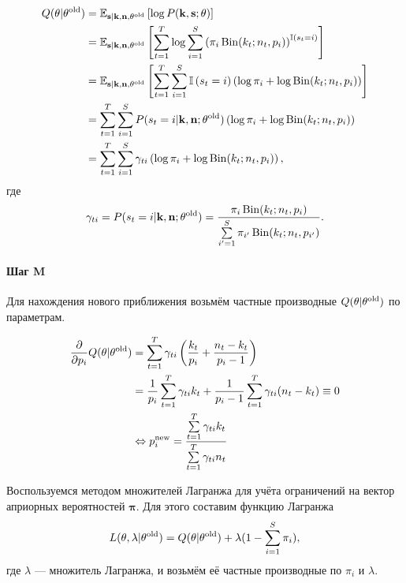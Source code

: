 \begin{align*}
  Q(\mathbf{\theta}|\mathbf{\theta}^{\operatorname{old}})
  &= \mathbb{E}_{\mathbf{s}|\mathbf{k}, \mathbf{n}, \mathbf{\theta^{\operatorname{old}}}} \left[ \log P(\mathbf{k}, \mathbf{s}; \mathbf{\theta}) \right] \\
  &= \mathbb{E}_{\mathbf{s}|\mathbf{k}, \mathbf{n}, \mathbf{\theta^{\operatorname{old}}}} \left[ \sum\limits_{t = 1}^T \log \sum\limits_{i = 1}^S
            \left( \pi_i \operatorname{Bin}(k_t; n_t, p_i) \right)^{\mathbb{I}\left( s_t=i \right)} \right] \\
  &= \mathbb{E}_{\mathbf{s}|\mathbf{k}, \mathbf{n}, \mathbf{\theta^{\operatorname{old}}}} \left[ \sum\limits_{t = 1}^T \sum\limits_{i = 1}^S
            \mathbb{I}\left( s_t=i \right) \left( \log \pi_i + \log \operatorname{Bin}(k_t; n_t, p_i) \right) \right] \\
  &= \sum\limits_{t = 1}^T \sum\limits_{i = 1}^S
     P(s_t = i|\mathbf{k}, \mathbf{n}; \mathbf{\theta}^{\operatorname{old}})
     \left( \log \pi_i + \log \operatorname{Bin}(k_t; n_t, p_i) \right) \\
  &= \sum\limits_{t = 1}^T \sum\limits_{i = 1}^S
     \gamma_{ti} \left( \log \pi_i + \log \operatorname{Bin}(k_t; n_t, p_i) \right), \\
\end{align*}
где
$$
\gamma_{ti}
= P(s_t = i|\mathbf{k}, \mathbf{n}; \mathbf{\theta}^{\operatorname{old}})
= \frac{\pi_i \operatorname{Bin}(k_t; n_t, p_i)}
       {\sum\limits_{i' = 1}^S \pi_{i'} \operatorname{Bin}(k_t; n_t, p_{i'})}.
$$

\paragraph{Шаг M}

Для нахождения нового приближения возьмём частные производные
$Q(\mathbf{\theta}|\mathbf{\theta}^{\operatorname{old}})$ по параметрам.

\begin{align*}
  \frac{\partial}{\partial p_i} Q(\mathbf{\theta}|\mathbf{\theta}^{\operatorname{old}})
  &= \sum\limits_{t = 1}^T \gamma_{ti} \left(
          \frac{k_t}{p_i} + \frac{n_t - k_t}{p_i - 1}
     \right) \\
  &= \frac{1}{p_i} \sum\limits_{t = 1}^T \gamma_{ti} k_t
   + \frac{1}{p_i - 1} \sum\limits_{t = 1}^T \gamma_{ti} (n_t - k_t) \equiv 0 \\
  &\Leftrightarrow
  p_i^{\operatorname{new}} = \frac{\sum\limits_{t = 1}^T \gamma_{ti} k_t}{\sum\limits_{t = 1}^T \gamma_{ti} n_t}
\end{align*}

Воспользуемся методом множителей Лагранжа для учёта ограничений на вектор
априорных вероятностей $\mathbf{\pi}$. Для этого составим функцию Лагранжа
$$
L(\mathbf{\theta}, \lambda|\mathbf{\theta}^{\operatorname{old}})
= Q(\mathbf{\theta}|\mathbf{\theta}^{\operatorname{old}})
+ \lambda (1 - \sum\limits_{i = 1}^S \pi_i),
$$
где $\lambda$ --- множитель Лагранжа, и возьмём её частные производные по $\pi_i$
и $\lambda$.

